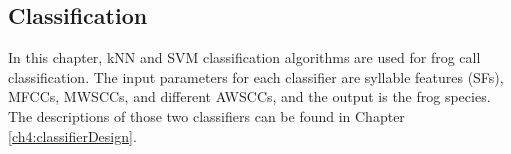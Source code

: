 \subsection{Classification}
In this chapter, kNN and SVM classification algorithms are used for frog call classification. The input parameters for each classifier are syllable features (SFs), MFCCs, MWSCCs, and different AWSCCs, and the output is the frog species.
The descriptions of those two classifiers can be found in Chapter \ref{ch4:classifierDesign}.

%
